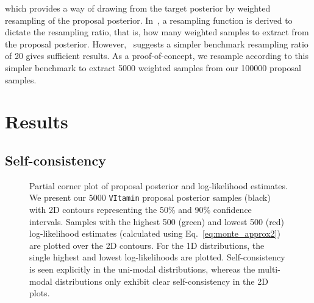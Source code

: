 \documentclass[a4paper]{jpconf}
\begin{document}
which provides a way of drawing from the target posterior by weighted resampling of the proposal posterior. In~\cite{resample_aus}, a resampling function is derived to dictate the resampling ratio, that is, how many weighted samples to extract from the proposal posterior. However,~\cite{brian2006resampling} suggests a simpler benchmark resampling ratio of 20 gives sufficient results. As a proof-of-concept, we resample according to this simpler benchmark to extract 5000 weighted samples from our 100000 proposal samples.


\section{Results}\label{results}

\subsection{Self-consistency}\label{results:self_consist} %

\begin{figure}
	\caption{Partial corner plot of proposal posterior and log-likelihood estimates. We present our 5000 \texttt{VItamin} proposal posterior samples (black) with 2D contours representing the 50\% and 90\% confidence intervals. Samples with the highest 500 (green) and lowest 500 (red) log-likelihood estimates (calculated using Eq.~\ref{eq:monte_approx2}) are plotted over the 2D contours. For the 1D distributions, the single highest and lowest log-likelihoods are plotted. Self-consistency is seen explicitly in the uni-modal distributions, whereas the multi-modal distributions only exhibit clear self-consistency in the 2D plots.}
	\label{fig:self_consist}
\end{figure}
\end{document}
